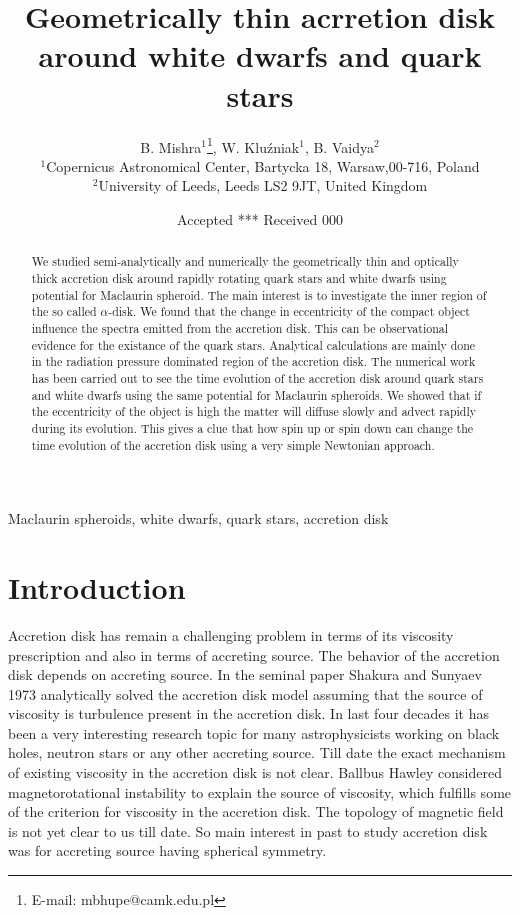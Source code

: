 \documentclass[useAMS,usenatbib]{mn2e}
\title[Geometrically thin acrretion disk around white dwarfs and quark stars]{Geometrically thin acrretion disk around white dwarfs and quark stars}
\author[B. Mishra, W. Klu\'zniak and B. Vaidya]{B. Mishra$^{1}$\thanks{E-mail:
mbhupe@camk.edu.pl}, W. Klu\'zniak$^{1}$, B. Vaidya$^{2}$\\
$^{1}$Copernicus Astronomical Center, Bartycka 18, Warsaw,00-716, Poland\\
$^{2}$University of Leeds, Leeds LS2 9JT, United Kingdom}
\begin{document}
\date{Accepted *** Received 000}

\pagerange{\pageref{firstpage}--\pageref{lastpage}} 

\maketitle

\label{firstpage}

\begin{abstract}
We studied semi-analytically and numerically the geometrically thin and optically thick accretion disk around rapidly rotating quark stars and white dwarfs using potential for Maclaurin spheroid. The main interest is to investigate the inner region of the so called $\alpha$-disk. We found that the change in eccentricity of the compact object influence the spectra emitted from the accretion disk. This can be observational evidence for the existance of the quark stars. Analytical calculations are mainly done in the radiation pressure dominated region of the accretion disk. The numerical work has been carried out to see the time evolution of the accretion disk around quark stars and white dwarfs using the same potential for Maclaurin spheroids. We showed that if the eccentricity of the object is high the matter will diffuse slowly and advect rapidly during its evolution. This gives a clue that how spin up or spin down can change the time evolution of the accretion disk using a very simple Newtonian approach.  

\end{abstract}

\begin{keywords}
Maclaurin spheroids, white dwarfs, quark stars, accretion disk
\end{keywords}

\section{Introduction}
Accretion disk has remain a challenging problem in terms of its viscosity prescription and also in terms of accreting source. The behavior of the accretion disk depends on accreting source. In the seminal paper Shakura and Sunyaev 1973 analytically solved the accretion disk model assuming that the source of viscosity is turbulence present in the accretion disk. In last four decades it has been a very interesting research topic for many astrophysicists working on black holes, neutron stars or any other accreting source. Till date the exact mechanism of existing viscosity in the accretion disk is not clear. Ballbus Hawley considered magnetorotational instability to explain the source of viscosity, which fulfills some of the criterion for viscosity in the accretion disk. The topology of magnetic field is not yet clear to us till date. So main interest in past to study accretion disk was for accreting source having spherical symmetry. 
\end{document}
